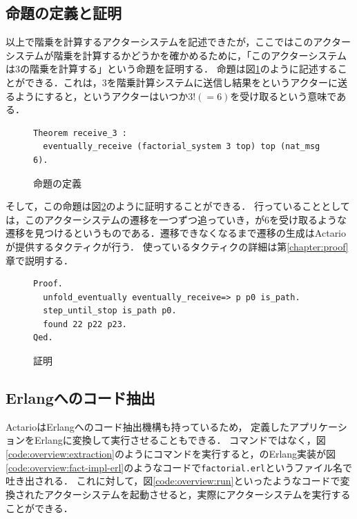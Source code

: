 \subsection{命題の定義と証明}

以上で階乗を計算するアクターシステムを記述できたが，ここではこのアクターシステムが階乗を計算するかどうかを確かめるために，「このアクターシステムは3の階乗を計算する」という命題を証明する．
命題は図\ref{code:overview:fact-spec}のように記述することができる．これは，$3$を階乗計算システムに送信し結果をというアクターに送るようにすると，というアクターはいつか$3! (= 6)$を受け取るという意味である．

\begin{figure}[tp]
\begin{lstlisting}
Theorem receive_3 :
  eventually_receive (factorial_system 3 top) top (nat_msg 6).
\end{lstlisting}
\caption{命題の定義}\label{code:overview:fact-spec}
\end{figure}

そして，この命題は図\ref{code:overview:fact-proof}のように証明することができる．
行っていることとしては，このアクターシステムの遷移を一つずつ追っていき，が$6$を受け取るような遷移を見つけるというものである．遷移できなくなるまで遷移の生成はActarioが提供するタクティクが行う．
使っているタクティクの詳細は第\ref{chapter:proof}章で説明する．

\begin{figure}[tp]
\begin{lstlisting}
Proof.
  unfold_eventually eventually_receive=> p p0 is_path.
  step_until_stop is_path p0.
  found 22 p22 p23.
Qed.
\end{lstlisting}
  \caption{証明}\label{code:overview:fact-proof}
\end{figure}


\subsection{Erlangへのコード抽出}

ActarioはErlangへのコード抽出機構も持っているため，
定義したアプリケーションをErlangに変換して実行させることもできる．
コマンドではなく，図\ref{code:overview:extraction}のようにコマンドを実行すると，のErlang実装が図\ref{code:overview:fact-impl-erl}のようなコードで\texttt{factorial.erl}というファイル名で吐き出される．
これに対して，図\ref{code:overview:run}といったようなコードで変換されたアクターシステムを起動させると，実際にアクターシステムを実行することができる．

